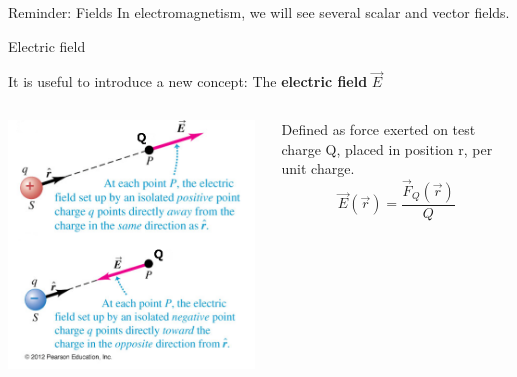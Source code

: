 {\begin{frame}{Reminder: Fields}
In electromagnetism, we will see several scalar and vector fields.

\end{frame}

} %


%
%
%

\begin{frame}{Electric field}

\begin{center}
 It is useful to introduce a new concept: The {\bf electric field} $\vec{E}$
\end{center}
\begin{columns}
  \begin{column}{0.50\textwidth}
   \begin{center}
     \includegraphics[width=0.98\textwidth]{./images/schematics/electric_field_2_charges_1.png}\\
   \end{center}
  \end{column}
  \begin{column}{0.50\textwidth}
  {\small
     Defined as force exerted on test charge Q, placed in position r, per unit charge.\\
     \begin{equation*}
       \vec{E}(\vec{r}) = \frac{\vec{F}_Q(\vec{r})}{Q}
     \end{equation*}
}
\end{column}
\end{columns}
\end{frame}
